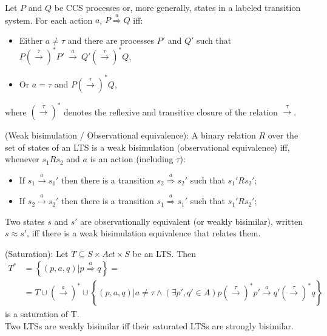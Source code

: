 \begin{definition}
Let $P$ and $Q$ be CCS processes or, more generally, states in a labeled transition system. For each action $a$,
$P\stackrel{a}{\Rightarrow}Q$ iff:
\begin{itemize}
	\item Either $a\neq\tau$ and there are processes $P'$ and $Q'$ such that $P\left(\stackrel{\tau}{\rightarrow}\right)^{*}P'\ \stackrel{a}{\rightarrow}\ Q'\left(\stackrel{\tau}{\rightarrow}\right)^{*}Q$,
	\item Or $a=\tau$ and $P\left(\stackrel{\tau}{\rightarrow}\right)^{*}Q$,
\end{itemize}
where $\left(\stackrel{\tau}{\rightarrow}\right)^{*}$ denotes the reflexive and transitive closure of the relation $\stackrel{\tau}{\rightarrow}$.
\end{definition}

\begin{definition}
(Weak bisimulation / Observational equivalence): A binary relation $R$ over the set of states of an LTS is a weak bisimulation (observational equivalence) iff, whenever $s_{1}Rs_{2}$ and $a$ is an action (including $\tau$):
\begin{itemize}
	\item If $s_{1}\stackrel{a}{\rightarrow}s_{1}'$ then there is a transition $s_{2}\stackrel{a}{\Rightarrow}s_{2}'$ such that $s_{1}'Rs_{2}'$;
	\item If $s_{2}\stackrel{a}{\rightarrow}s_{2}'$ then there is a transition $s_{1}\stackrel{a}{\Rightarrow}s_{1}'$ such that $s_{1}'Rs_{2}'$;
\end{itemize}
Two states $s$ and $s'$ are observationally equivalent (or weakly bisimilar), written $s\approx s'$, iff there is a weak bisimulation equivalence that relates them.
\end{definition}

\begin{definition}
	(Saturation): Let $T\subseteq S\times Act\times S$ be an LTS. Then
\begin{align*}
 T^{*} &=\left\{\left(p,a,q\right)| p\stackrel{a}{\Rightarrow}q\right\}= \\
 &=T\cup\left(\stackrel{a}{\rightarrow}\right)^{*}\cup\left\{\left(p,a,q\right)| a\neq\tau\wedge\left(\exists p',q'\in A\right) p\left(\stackrel{\tau}{\rightarrow}\right)^{*}p'\stackrel{a}{\rightarrow}q'\left(\stackrel{\tau}{\rightarrow}\right)^{*}q\right\}
\end{align*} 
is a saturation of T.\\
Two LTSs are weakly bisimilar iff their saturated LTSs are strongly bisimilar. 
\end{definition}

